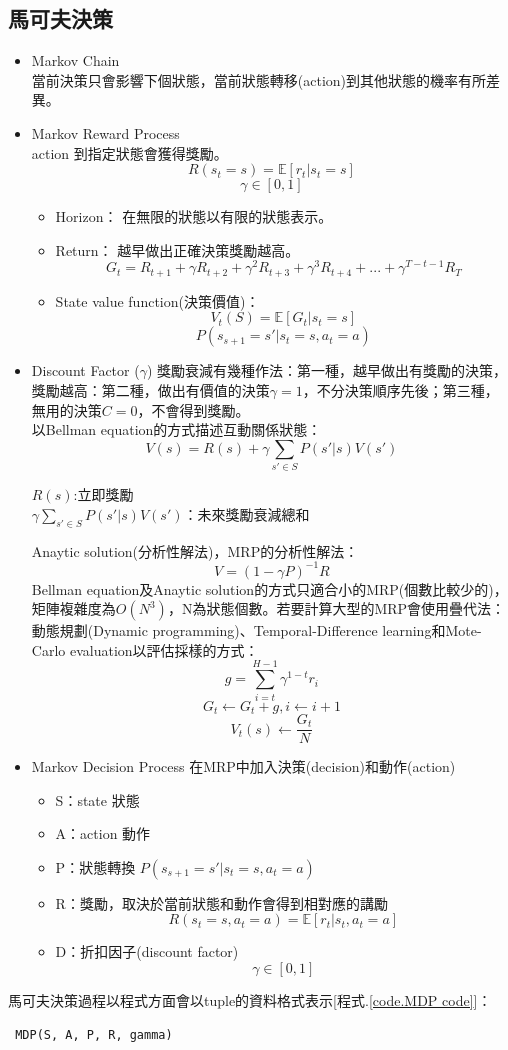 \documentclass[14pt,a4paper]{report}  %
\begin{document}
\subsection{馬可夫決策}
\begin{itemize}
\item Markov Chain\\
當前決策只會影響下個狀態，當前狀態轉移(action)到其他狀態的機率有所差異。
\item Markov Reward Process\\
action 到指定狀態會獲得獎勵。
$$R(s_t=s) = \mathbb{E}[r_t|s_t = s]$$
$$\gamma \in [0, 1]$$
\begin{itemize}
\item Horizon：
在無限的狀態以有限的狀態表示。
\item Return：
越早做出正確決策獎勵越高。
$$G_t = R_{t+1}+\gamma R_{t+2}+\gamma^2 R_{t+3}+\gamma^3 R_{t+4}+...+\gamma^{T-t-1} R_{T}$$
\item State value function(決策價值)：
$$V_t(S) = \mathbb{E}[G_t|s_t = s]$$
$$P(s_{s+1}=s'|s_t=s,a_t=a)$$
\end{itemize}
\item Discount Factor ($\gamma$)
獎勵衰減有幾種作法：第一種，越早做出有獎勵的決策，獎勵越高：第二種，做出有價值的決策$\gamma = 1$，不分決策順序先後；第三種，無用的決策$C = 0$，不會得到獎勵。\\
以Bellman equation的方式描述互動關係狀態：\\
$$V(s) = R(s)+\gamma\sum_{s'\in S}P(s'|s)V(s')$$
\begin{center}
$R(s)$:立即獎勵\\
$\gamma\sum_{s'\in S}P(s'|s)V(s')$：未來獎勵衰減總和
\end{center}
Anaytic solution(分析性解法)，MRP的分析性解法：
$$V = (1-\gamma P)^{-1}R$$
Bellman equation及Anaytic solution的方式只適合小的MRP(個數比較少的)，矩陣複雜度為$O(N^3)$，N為狀態個數。若要計算大型的MRP會使用疊代法：動態規劃(Dynamic programming)、Temporal-Difference learning和Mote-Carlo evaluation以評估採樣的方式：
$$g = \sum_{i=t}^{H-1}\gamma^{1-t}r_i$$
$$G_t \leftarrow G_t+g,  i \leftarrow i+1$$
$$V_t(s) \leftarrow \frac{G_t}{N}$$
\item Markov Decision Process
\quad 在MRP中加入決策(decision)和動作(action)
\begin{itemize}
\item S：state 狀態
\item A：action 動作
\item P：狀態轉換
$P(s_{s+1}=s'|s_t=s,a_t=a)$
\item R：獎勵，取決於當前狀態和動作會得到相對應的講勵
$$R(s_t=s, a_t=a) = \mathbb{E}[r_t|s_t, a_t=a]$$
\item D：折扣因子(discount factor)
$$\gamma \in [0,1]$$
\end{itemize}
\end{itemize}
馬可夫決策過程以程式方面會以tuple的資料格式表示[程式.\ref{code.MDP code}]：
\label{code.MDP code}
\begin{lstlisting}
 MDP(S, A, P, R, gamma)
\end{lstlisting}
\end{document}
